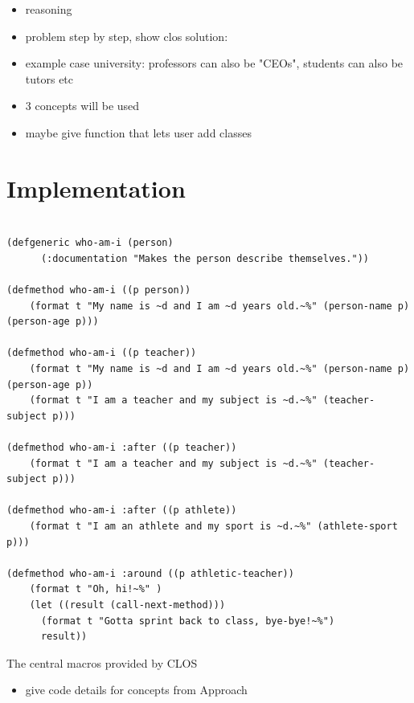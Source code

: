 \documentclass[oribibl]{llncs}
\begin{document}
\begin{itemize}
\item reasoning
\item problem step by step, show clos solution:
\item example case university: professors can also be "CEOs", students can also be tutors etc
\end{itemize}

\begin{itemize}
\item 3 concepts will be used
\item maybe give function that lets user add classes
\end{itemize}


\section{Implementation}
\label{sec:implementation}

\begin{listing}[]%
\begin{verbatim}

(defgeneric who-am-i (person)
      (:documentation "Makes the person describe themselves."))

(defmethod who-am-i ((p person))
    (format t "My name is ~d and I am ~d years old.~%" (person-name p) (person-age p)))

(defmethod who-am-i ((p teacher))
    (format t "My name is ~d and I am ~d years old.~%" (person-name p) (person-age p))
    (format t "I am a teacher and my subject is ~d.~%" (teacher-subject p)))

(defmethod who-am-i :after ((p teacher))
    (format t "I am a teacher and my subject is ~d.~%" (teacher-subject p)))

(defmethod who-am-i :after ((p athlete))
    (format t "I am an athlete and my sport is ~d.~%" (athlete-sport p)))

(defmethod who-am-i :around ((p athletic-teacher))
    (format t "Oh, hi!~%" )
    (let ((result (call-next-method)))
      (format t "Gotta sprint back to class, bye-bye!~%")
      result))

\end{verbatim}
\caption{The central macros provided by CLOS}
\label{lst:clossyntax}
\end{listing}



\begin{itemize}
\item give code details for concepts from Approach
\end{itemize}
\end{document}
